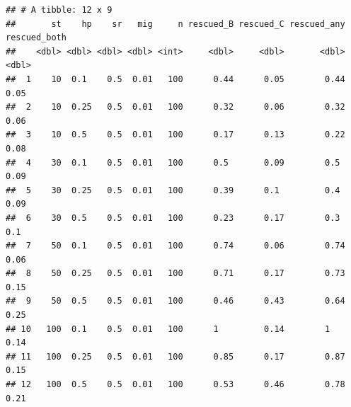 \documentclass[
]{article}
\newenvironment{Shaded}{\begin{snugshade}}{\end{snugshade}}
\newcommand{\AttributeTok}[1]{\textcolor[rgb]{0.13,0.29,0.53}{#1}}
\newcommand{\CommentTok}[1]{\textcolor[rgb]{0.56,0.35,0.01}{\textit{#1}}}
\newcommand{\DecValTok}[1]{\textcolor[rgb]{0.00,0.00,0.81}{#1}}
\newcommand{\FloatTok}[1]{\textcolor[rgb]{0.00,0.00,0.81}{#1}}
\newcommand{\FunctionTok}[1]{\textcolor[rgb]{0.13,0.29,0.53}{\textbf{#1}}}
\newcommand{\NormalTok}[1]{#1}
\newcommand{\OtherTok}[1]{\textcolor[rgb]{0.56,0.35,0.01}{#1}}
\newcommand{\SpecialCharTok}[1]{\textcolor[rgb]{0.81,0.36,0.00}{\textbf{#1}}}
\begin{document}
\begin{Shaded}
\end{Shaded}

\begin{verbatim}
## # A tibble: 12 x 9
##       st    hp    sr   mig     n rescued_B rescued_C rescued_any rescued_both
##    <dbl> <dbl> <dbl> <dbl> <int>     <dbl>     <dbl>       <dbl>        <dbl>
##  1    10  0.1    0.5  0.01   100      0.44      0.05        0.44         0.05
##  2    10  0.25   0.5  0.01   100      0.32      0.06        0.32         0.06
##  3    10  0.5    0.5  0.01   100      0.17      0.13        0.22         0.08
##  4    30  0.1    0.5  0.01   100      0.5       0.09        0.5          0.09
##  5    30  0.25   0.5  0.01   100      0.39      0.1         0.4          0.09
##  6    30  0.5    0.5  0.01   100      0.23      0.17        0.3          0.1 
##  7    50  0.1    0.5  0.01   100      0.74      0.06        0.74         0.06
##  8    50  0.25   0.5  0.01   100      0.71      0.17        0.73         0.15
##  9    50  0.5    0.5  0.01   100      0.46      0.43        0.64         0.25
## 10   100  0.1    0.5  0.01   100      1         0.14        1            0.14
## 11   100  0.25   0.5  0.01   100      0.85      0.17        0.87         0.15
## 12   100  0.5    0.5  0.01   100      0.53      0.46        0.78         0.21
\end{verbatim}
\end{document}
